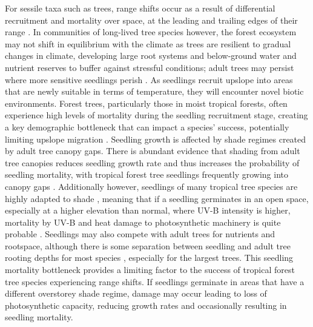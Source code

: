 \documentclass[a4paper, 11pt]{article}
\begin{document}
For sessile taxa such as trees, range shifts occur as a result of differential recruitment and mortality over space, at the leading and trailing edges of their range \citep{Corlett2013}. In communities of long-lived tree species however, the forest ecosystem may not shift in equilibrium with the climate as trees are resilient to gradual changes in climate, developing large root systems and below-ground water and nutrient reserves to buffer against stressful conditions; adult trees may persist where more sensitive seedlings perish \citep{Bell2014, Lenoir2009}. As seedlings recruit upslope into areas that are newly suitable in terms of temperature, they will encounter novel biotic environments. Forest trees, particularly those in moist tropical forests, often experience high levels of mortality during the seedling recruitment stage, creating a key demographic bottleneck that can impact a species' success, potentially limiting upslope migration \citep{Coomes2000}. Seedling growth is affected by shade regimes created by adult tree canopy gaps. There is abundant evidence that shading from adult tree canopies reduces seedling growth rate and thus increases the probability of seedling mortality, with tropical forest tree seedlings frequently growing into canopy gaps \citep{Valladares2016}. Additionally however, seedlings of many tropical tree species are highly adapted to shade \citep{Matsubara2009}, meaning that if a seedling germinates in an open space, especially at a higher elevation than normal, where UV-B intensity is higher, mortality by UV-B and heat damage to photosynthetic machinery is quite probable \citep{Krause2001}. Seedlings may also compete with adult trees for nutrients and rootspace, although there is some separation between seedling and adult tree rooting depths for most species \citep{Lewis2000}, especially for the largest trees. This seedling mortality bottleneck provides a limiting factor to the success of tropical forest tree species experiencing range shifts. If seedlings germinate in areas that have a different overstorey shade regime, damage may occur leading to loss of photosynthetic capacity, reducing growth rates and occasionally resulting in seedling mortality.  
\end{document}
